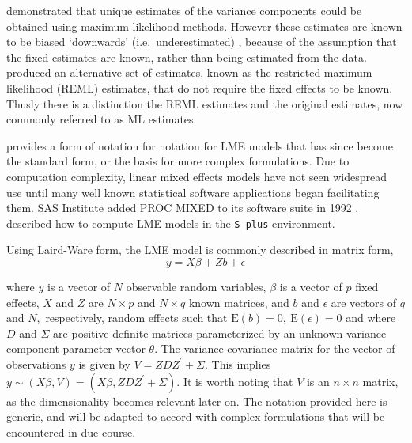 \documentclass[MAIN.tex]{subfiles}
\begin{document}
\citet{HartleyRao} demonstrated that unique estimates of the variance components could be obtained using maximum likelihood methods. However these estimates are known to be biased `downwards' (i.e.\ underestimated) , because of the assumption that the fixed estimates are known, rather than being estimated from the data. \citet{PattersonThompson} produced an alternative set of estimates, known as the restricted maximum likelihood (REML) estimates, that do not require the fixed effects to be known. Thusly there is a distinction the REML estimates and the original estimates, now commonly referred to as ML estimates.

\citet{LW82} provides a form of notation for notation for LME models that has since become the standard form, or the basis for more complex formulations. Due to computation complexity, linear mixed effects models have not seen widespread use until many well known statistical software applications began facilitating them. SAS Institute added PROC MIXED to its software suite in 1992 \citep{singer}. \citet{PB} described how to compute LME models in the \texttt{S-plus} environment.

Using Laird-Ware form, the LME model is commonly described in matrix form,
\begin{equation}
y = X\beta + Zb + \epsilon
\label{LW}
\end{equation}

\noindent where $y$ is a vector of $N$ observable random variables, $\beta$ is a vector of $p$ fixed effects, $X$ and $Z$ are $N \times p$ and $N \times q$ known matrices, and $b$ and $\epsilon$  are vectors of $q$ and $N,$ respectively, random effects such that $\mathrm{E}(b)=0, \ \mathrm{E}(\epsilon)=0$
and
where $D$ and $\Sigma$ are positive definite matrices parameterized by an unknown variance component parameter vector $ \theta.$ The variance-covariance matrix for the vector of observations $y$ is given by $V = ZDZ^{\prime}+ \Sigma.$ This implies $y \sim(X\beta, V) = (X\beta,ZDZ^{\prime}+ \Sigma)$. It is worth noting that $V$ is an $n \times n$ matrix, as the dimensionality becomes relevant later on. The notation provided here is generic, and will be adapted to accord with complex formulations that will be encountered in due course.

\end{document}
